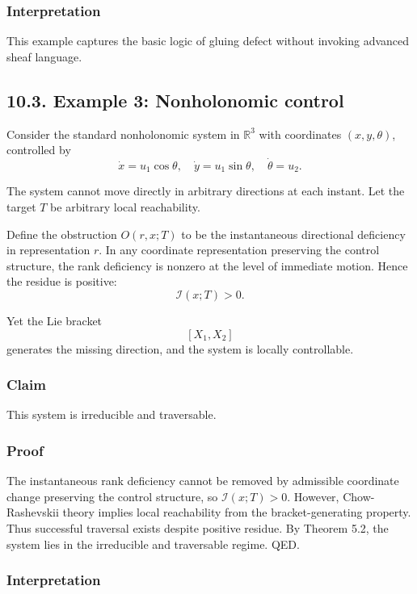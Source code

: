 \documentclass[
]{article}
\begin{document}
\subsubsection{Interpretation}\label{interpretation-4}

This example captures the basic logic of gluing defect without invoking
advanced sheaf language.

\subsection{10.3. Example 3: Nonholonomic
control}\label{example-3-nonholonomic-control}

Consider the standard nonholonomic system in \(\mathbb{R}^3\) with
coordinates \((x,y,\theta)\), controlled by \[
\dot{x} = u_1 \cos\theta,\quad
\dot{y} = u_1 \sin\theta,\quad
\dot{\theta} = u_2.
\]

The system cannot move directly in arbitrary directions at each instant.
Let the target \(T\) be arbitrary local reachability.

Define the obstruction \(O(r,x;T)\) to be the instantaneous directional
deficiency in representation \(r\). In any coordinate representation
preserving the control structure, the rank deficiency is nonzero at the
level of immediate motion. Hence the residue is positive: \[
\mathcal{I}(x;T) > 0.
\]

Yet the Lie bracket \[
[X_1,X_2]
\] generates the missing direction, and the system is locally
controllable.

\subsubsection{Claim}\label{claim-2}

This system is irreducible and traversable.

\subsubsection{Proof}\label{proof-9}

The instantaneous rank deficiency cannot be removed by admissible
coordinate change preserving the control structure, so
\(\mathcal{I}(x;T) > 0\). However, Chow-Rashevskii theory implies local
reachability from the bracket-generating property. Thus successful
traversal exists despite positive residue. By Theorem 5.2, the system
lies in the irreducible and traversable regime. QED.

\subsubsection{Interpretation}\label{interpretation-5}
\end{document}
